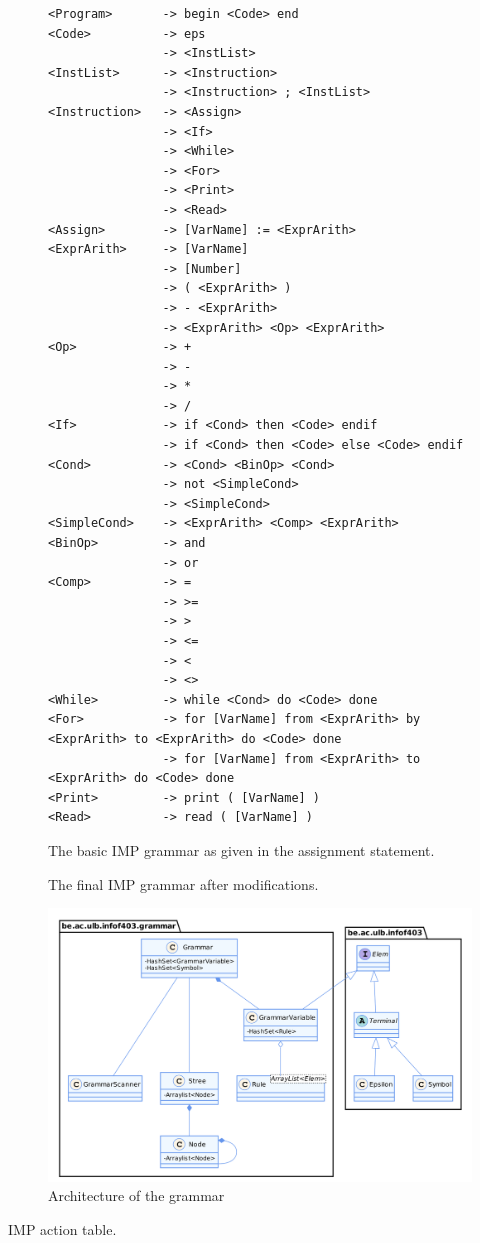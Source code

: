 \documentclass[a4paper,11pt]{article}
\begin{document}
    \begin{figure}[h!]
      \centering
      \begin{lstlisting}
<Program>       -> begin <Code> end
<Code>          -> eps
                -> <InstList>
<InstList>      -> <Instruction>
                -> <Instruction> ; <InstList>
<Instruction>   -> <Assign>
                -> <If>
                -> <While>
                -> <For>
                -> <Print>
                -> <Read>
<Assign>        -> [VarName] := <ExprArith>
<ExprArith>     -> [VarName]
                -> [Number]
                -> ( <ExprArith> )
                -> - <ExprArith>
                -> <ExprArith> <Op> <ExprArith>
<Op>            -> +
                -> -
                -> *
                -> /
<If>            -> if <Cond> then <Code> endif
                -> if <Cond> then <Code> else <Code> endif
<Cond>          -> <Cond> <BinOp> <Cond>
                -> not <SimpleCond>
                -> <SimpleCond>
<SimpleCond>    -> <ExprArith> <Comp> <ExprArith>
<BinOp>         -> and
                -> or
<Comp>          -> = 
                -> >= 
                -> > 
                -> <= 
                -> < 
                -> <> 
<While>         -> while <Cond> do <Code> done
<For>           -> for [VarName] from <ExprArith> by <ExprArith> to <ExprArith> do <Code> done
                -> for [VarName] from <ExprArith> to <ExprArith> do <Code> done
<Print>         -> print ( [VarName] )
<Read>          -> read ( [VarName] )
      \end{lstlisting}
      \caption{The basic IMP grammar as given in the assignment statement.}
      \label{fig:basicimpgrammar}
    \end{figure}
  
  \begin{figure}[h!]
    \centering
    
    \caption{The final IMP grammar after modifications.}
    \label{fig:finalimpgrammar}
  \end{figure}

  \begin{figure}
    \centering
    \includegraphics[width=\textwidth]{./img/class_grammar.png}
    \caption{Architecture of the grammar}
    \label{fig:grammararchitecture}
  \end{figure}
  
  \begin{table} %
    \centering
    
    \caption{IMP action table.}
    \label{impactiontable}
  \end{table}
      
\end{document}
